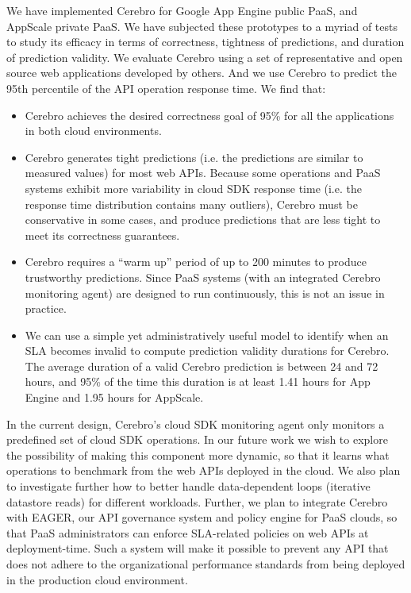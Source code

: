 We have implemented Cerebro for Google App Engine public PaaS, 
and AppScale private PaaS. We have subjected these
prototypes to a myriad of tests to study its efficacy in terms of
correctness, tightness of predictions, and duration of prediction 
validity.  We evaluate Cerebro using a set of representative
and open source web applications developed by others.  And we use Cerebro to
predict the 95th percentile of the API operation response time. 
We find that:
\begin{itemize}
\item Cerebro achieves the desired correctness goal of 95\% for all the applications in both cloud environments.
\item Cerebro generates tight predictions (i.e.
the predictions are similar to measured values) for most web APIs.  Because
some operations and PaaS systems exhibit more variability in cloud SDK response
time (i.e. the response time distribution contains many outliers), 
Cerebro must be conservative in some cases, and produce predictions that are less tight
to meet its correctness guarantees.  
\item Cerebro requires a ``warm up'' period of up to 200 minutes to produce trustworthy predictions. Since PaaS systems (with an integrated Cerebro monitoring agent) are designed to run continuously, this is not an issue in practice. 
\item We can use a simple yet administratively useful model to identify when an 
SLA becomes invalid to compute
prediction validity durations for Cerebro.  The average duration of a valid
Cerebro prediction is between 24 and 72 hours,
and 95\% of the time this duration is at least 
1.41 hours for App Engine and 1.95 hours for AppScale.
\end{itemize}

In the current design, Cerebro's cloud SDK monitoring agent only monitors 
a predefined set of cloud SDK operations. In our future work we wish 
to explore the possibility of making this component more dynamic,
so that it learns what operations to benchmark from the web APIs 
deployed in the cloud. We also plan to investigate further how to better
handle data-dependent loops (iterative datastore reads) for different workloads. 
Further, we plan
to integrate Cerebro with EAGER, our API governance system 
and policy engine for PaaS clouds, so 
that PaaS administrators can enforce SLA-related policies on web APIs at deployment-time.
Such a system will make it possible to prevent any API that 
does not adhere to the organizational performance
standards from being deployed in the production cloud environment.
